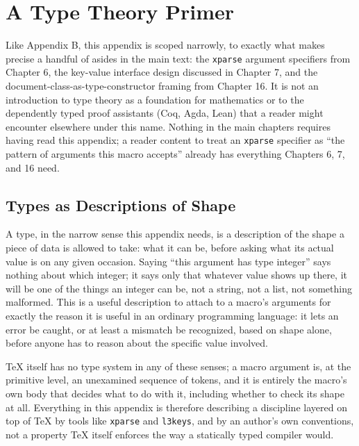\hypertarget{appendix-c-a-type-theory-primer}{%
\chapter{A Type Theory Primer}\label{appendix-c-a-type-theory-primer}}

Like Appendix B, this appendix is scoped narrowly, to exactly what makes precise a handful of asides in the main text: the \texttt{xparse} argument specifiers from Chapter 6, the key-value interface design discussed in Chapter 7, and the document-class-as-type-constructor framing from Chapter 16. It is not an introduction to type theory as a foundation for mathematics or to the dependently typed proof assistants (Coq, Agda, Lean) that a reader might encounter elsewhere under this name. Nothing in the main chapters requires having read this appendix; a reader content to treat an \texttt{xparse} specifier as ``the pattern of arguments this macro accepts'' already has everything Chapters 6, 7, and 16 need.

\hypertarget{c.1-types-as-descriptions-of-shape}{%
\section{Types as Descriptions of Shape}\label{c.1-types-as-descriptions-of-shape}}

A type, in the narrow sense this appendix needs, is a description of the shape a piece of data is allowed to take: what it can be, before asking what its actual value is on any given occasion. Saying ``this argument has type integer'' says nothing about which integer; it says only that whatever value shows up there, it will be one of the things an integer can be, not a string, not a list, not something malformed. This is a useful description to attach to a macro's arguments for exactly the reason it is useful in an ordinary programming language: it lets an error be caught, or at least a mismatch be recognized, based on shape alone, before anyone has to reason about the specific value involved.

TeX itself has no type system in any of these senses; a macro argument is, at the primitive level, an unexamined sequence of tokens, and it is entirely the macro's own body that decides what to do with it, including whether to check its shape at all. Everything in this appendix is therefore describing a discipline layered on top of TeX by tools like \texttt{xparse} and \texttt{l3keys}, and by an author's own conventions, not a property TeX itself enforces the way a statically typed compiler would.

